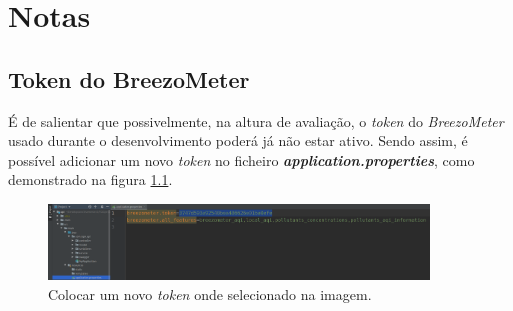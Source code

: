 
\chapter{Notas}

\section{Token do BreezoMeter}
É de salientar que possivelmente, na altura de avaliação, o \textit{token} do \textit{BreezoMeter} usado durante o desenvolvimento poderá já não estar ativo. Sendo assim, é possível adicionar um novo \textit{token} no ficheiro \textbf{\textit{application.properties}}, como demonstrado na figura \ref{fig:properties}.

\begin{figure}[h]
   \centering
   \includegraphics[width=0.90\textwidth]{images/properties}
   \caption{Colocar um novo \textit{token} onde selecionado na imagem.}
   \label{fig:properties}
\end{figure}
